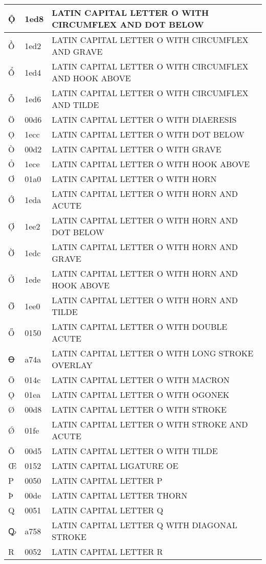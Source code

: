 \documentclass[12pt,letterpaper,openany]{book}
\begin{document}
\begin{center}
\begin{supertabular}{|m{0.25in}|m{0.5in}|m{4in}|}
Ộ & 1ed8 & \scriptsize LATIN CAPITAL LETTER O WITH CIRCUMFLEX AND DOT BELOW\\\hline
Ồ & 1ed2 & LATIN CAPITAL LETTER O WITH CIRCUMFLEX AND GRAVE\\\hline
Ổ & 1ed4 & \scriptsize LATIN CAPITAL LETTER O WITH CIRCUMFLEX AND HOOK ABOVE\\\hline
Ỗ & 1ed6 & LATIN CAPITAL LETTER O WITH CIRCUMFLEX AND TILDE\\\hline
Ö & 00d6 & LATIN CAPITAL LETTER O WITH DIAERESIS\\\hline
Ọ & 1ecc & LATIN CAPITAL LETTER O WITH DOT BELOW\\\hline
Ò & 00d2 & LATIN CAPITAL LETTER O WITH GRAVE\\\hline
Ỏ & 1ece & LATIN CAPITAL LETTER O WITH HOOK ABOVE\\\hline
Ơ & 01a0 & LATIN CAPITAL LETTER O WITH HORN\\\hline
Ớ & 1eda & LATIN CAPITAL LETTER O WITH HORN AND ACUTE\\\hline
Ợ & 1ee2 & LATIN CAPITAL LETTER O WITH HORN AND DOT BELOW\\\hline
Ờ & 1edc & LATIN CAPITAL LETTER O WITH HORN AND GRAVE\\\hline
Ở & 1ede & LATIN CAPITAL LETTER O WITH HORN AND HOOK ABOVE\\\hline
Ỡ & 1ee0 & LATIN CAPITAL LETTER O WITH HORN AND TILDE\\\hline
Ő & 0150 & LATIN CAPITAL LETTER O WITH DOUBLE ACUTE\\\hline
Ꝋ & a74a & LATIN CAPITAL LETTER O WITH LONG STROKE OVERLAY\\\hline
Ō & 014c & LATIN CAPITAL LETTER O WITH MACRON\\\hline
Ǫ & 01ea & LATIN CAPITAL LETTER O WITH OGONEK\\\hline
Ø & 00d8 & LATIN CAPITAL LETTER O WITH STROKE\\\hline
Ǿ & 01fe & LATIN CAPITAL LETTER O WITH STROKE AND ACUTE\\\hline
Õ & 00d5 & LATIN CAPITAL LETTER O WITH TILDE\\\hline
Œ & 0152 & LATIN CAPITAL LIGATURE OE\\\hline
P & 0050 & LATIN CAPITAL LETTER P\\\hline
Þ & 00de & LATIN CAPITAL LETTER THORN\\\hline
Q & 0051 & LATIN CAPITAL LETTER Q\\\hline
Ꝙ & a758 & LATIN CAPITAL LETTER Q WITH DIAGONAL STROKE\\\hline
R & 0052 & LATIN CAPITAL LETTER R\\\hline

\end{supertabular}
\end{center}
\end{document}
